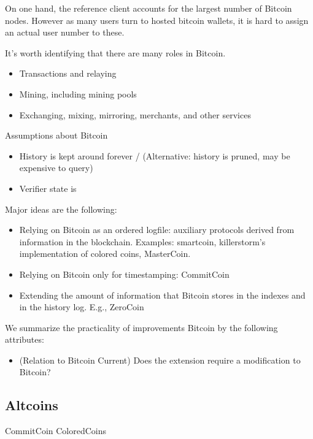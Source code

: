 On one hand, the reference client accounts for the largest number of Bitcoin nodes. However as many users turn to hosted bitcoin wallets, it is hard to assign an actual user number to these.


It's worth identifying that there are many roles in Bitcoin.
\begin{itemize}
\item Transactions and relaying
\item Mining, including mining pools
\item Exchanging, mixing, mirroring, merchants, and other services
\end{itemize}
 
Assumptions about Bitcoin
\begin{itemize}
\item History is kept around forever / (Alternative: history is pruned, may be expensive to query)
\item Verifier state is
\end{itemize}


Major ideas are the following:
\begin{itemize}
\item Relying on Bitcoin as an ordered logfile: auxiliary protocols derived from information in the blockchain. Examples: smartcoin, killerstorm's implementation of colored coins, MasterCoin.
\item Relying on Bitcoin only for timestamping: CommitCoin
\item Extending the amount of information that Bitcoin stores in the indexes and in the history log. E.g., ZeroCoin
\end{itemize}

We summarize the practicality of improvements Bitcoin by the following attributes:
\begin{itemize}
\item (Relation to Bitcoin Current) Does the extension require a modification to Bitcoin?
\end{itemize}

\cite{jgarzik-smartcoin}
\cite{miller2001capability}
\cite{szabo1997formalizing,bitcointalk-bondmarkets,wiki-distributedmarkets}


\subsection{Altcoins}



\begin{table}
\begin{tabular}
CommitCoin
ColoredCoins
\end{tabular}
\end{table}
